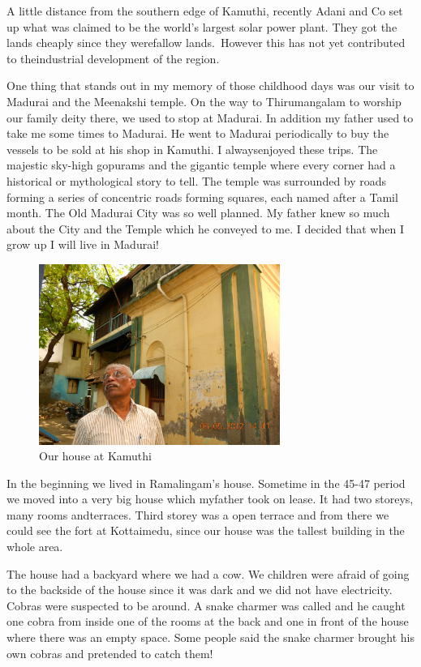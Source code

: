 A little distance from the southern edge of Kamuthi, recently Adani and 
Co set up what was claimed to be the world's largest solar power plant. 
They got the lands cheaply since they were\break fallow lands.\ However this 
has not yet contributed to the\break industrial development of the region.

One thing that stands out in my memory of those childhood days was our 
visit to Madurai and the Meenakshi temple. On the way to Thirumangalam 
to worship our family deity there, we used to stop at Madurai. In 
addition my father used to take me some times to Madurai. He went to 
Madurai periodically to buy the vessels to be sold at his shop in 
Kamuthi. I always\break enjoyed these trips. The majestic sky-high gopurams 
and the gigantic temple where every corner had a historical or 
mythological story to tell. The temple was surrounded by roads for\-ming a 
series of concentric roads forming squares, each named after a Tamil 
month. The Old Madurai City was so well planned. My father knew so much 
about the City and the Temple which he conveyed to me. I decided that 
when I grow up I will live in Madurai!

\begin{figure}[h]
\centering
\includegraphics[width=0.7\textwidth]{images/new-images/02-Rajaji-home.jpg}
\caption{Our house at Kamuthi}
\end{figure}
\vspace{-\topsep}

In the beginning we lived in Ramalingam's house. Sometime in the 45-47 
period we moved into a very big house which my\break father took on lease. It 
had two storeys, many rooms and\break terraces. Third storey was a open 
terrace and from there we could see the fort at Kottaimedu, since our 
house was the tallest building in the whole area.

The house had a backyard where we had a cow. We children were afraid of 
going to the backside of the house since it was dark and we did not have 
electricity. Cobras were suspected to be around. A snake charmer was 
called and he caught one cobra from inside one of the rooms at the back 
and one in front of the house where there was an empty space. Some 
people said the snake charmer brought his own cobras and pretended to 
catch them!


